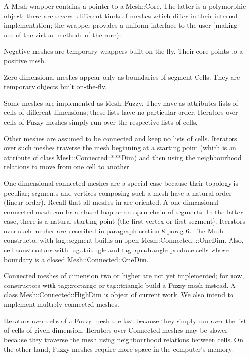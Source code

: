 A {\codett Mesh} wrapper contains a pointer to a {\codett Mesh::Core}.
The latter is a polymorphic object; there are several different kinds of meshes
which differ in their internal implementation; the wrapper provides a uniform interface
to the user (making use of the virtual methods of the core).

Negative meshes are temporary wrappers built on-the-fly.
Their core points to a positive mesh.

Zero-dimensional meshes appear only as boundaries of segment {\codett Cell}s.
They are temporary objects built on-the-fly.

Some meshes are implemented as {\codett Mesh::Fuzzy}.
They have as attributes lists of cells of different dimensions;
these lists have no particular order.
Iterators over cells of {\codett Fuzzy} meshes simply run over the respective lists of cells.

Other meshes are assumed to be connected and keep no lists of cells.
Iterators over such meshes traverse the mesh beginning at a starting point (which is an
attribute of class {\codett Mesh::Connected::***Dim}) and then using the neighbourhood relations
to move from one cell to another.

One-dimensional connected meshes are a special case because their topology is peculiar;
segments and vertices composing such a mesh have a natural order (linear order).
Recall that all meshes in {\maniFEM} are oriented.
A one-dimensional connected mesh can be a closed loop or an open chain of segments.
In the latter case, there is a natural starting point (the first vertex or first segment).
Iterators over such meshes are described in paragraph \numb section 8.\numb parag 6.
The {\codett Mesh} constructor with {\codett tag::segment} builds an open
{\codett Mesh::Connected::\break ::OneDim}.
Also, cell constructors with {\codett tag::triangle} and {\codett tag::quadrangle} produce cells
whose boundary is a closed {\codett Mesh::Connected::OneDim}.

Connected meshes of dimension two or higher are not yet implemented; for now,
constructors with {\codett tag::rectange} or {\codett tag::triangle} build a
{\codett Fuzzy} mesh instead.
A class {\codett Mesh::Connected::HighDim} is object of current work.
We also intend to implement multiply connected meshes.

Iterators over cells of a {\codett Fuzzy} mesh are fast because they simply run over the
list of cells of given dimension.
Iterators over {\codett Connected} meshes may be slower because they traverse the mesh using
neighbourhood relations between cells.
On the other hand, {\codett Fuzzy} meshes require more space in the computer's memory.

